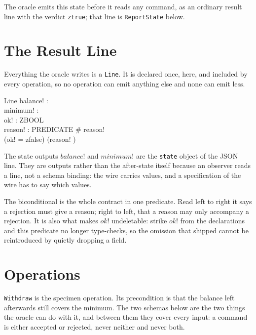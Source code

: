 \documentclass[a4paper,10pt,fleqn]{article}
\begin{document}
The oracle emits this state before it reads any command, as an ordinary
result line with the verdict \texttt{ztrue}; that line is
\texttt{ReportState} below.

\section{The Result Line}

Everything the oracle writes is a \texttt{Line}. It is declared once,
here, and included by every operation, so no operation can emit anything
else and none can emit less.

\begin{schema}{Line}
  balance! : \nat \\
  minimum! : \nat \\
  ok! : ZBOOL \\
  reason! : \finset PREDICATE
  \where
  \# reason!  \\
  (ok! = zfalse) \iff (reason! \neq \emptyset)
\end{schema}

The state outputs $balance!$ and $minimum!$ are the \texttt{state} object
of the JSON line. They are outputs rather than the after-state itself
because an observer reads a line, not a schema binding: the wire carries
values, and a specification of the wire has to say which values.

The biconditional is the whole contract in one predicate. Read left to
right it says a rejection must give a reason; right to left, that a
reason may only accompany a rejection. It is also what makes $ok!$
undeletable: strike $ok!$ from the declarations and this predicate no
longer type-checks, so the omission that shipped cannot be reintroduced
by quietly dropping a field.

\section{Operations}

\texttt{Withdraw} is the specimen operation. Its precondition is that the
balance left afterwards still covers the minimum. The two schemas below
are the two things the oracle can do with it, and between them they cover
every input: a command is either accepted or rejected, never neither and
never both.
\end{document}
